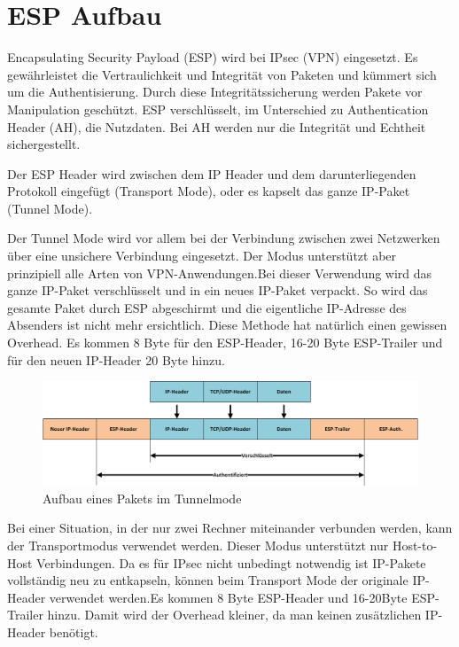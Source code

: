 \section{ESP Aufbau}
\label{sec:ESP Aufbau}

\noindent Encapsulating Security Payload (ESP) wird bei \ac{IPsec} (VPN) eingesetzt. Es gewährleistet die Vertraulichkeit und Integrität von Paketen und kümmert sich um die Authentisierung. Durch diese Integritätssicherung werden Pakete vor Manipulation geschützt. ESP verschlüsselt, im Unterschied zu Authentication Header (AH), die Nutzdaten. Bei AH werden nur die Integrität und Echtheit sichergestellt.\cite{elektronik_kompendium}

\noindent Der ESP Header wird zwischen dem IP Header und dem darunterliegenden Protokoll eingefügt (Transport Mode), oder es kapselt das ganze IP-Paket (Tunnel Mode).\cite{rfc4303}

\noindent Der Tunnel Mode wird vor allem bei der Verbindung zwischen zwei Netzwerken über eine unsichere Verbindung eingesetzt. Der Modus unterstützt aber prinzipiell alle Arten von VPN-Anwendungen.Bei dieser Verwendung wird das ganze IP-Paket verschlüsselt und in ein neues IP-Paket verpackt. So wird das gesamte Paket durch ESP abgeschirmt und die eigentliche IP-Adresse des Absenders ist nicht mehr ersichtlich. Diese Methode hat natürlich einen gewissen Overhead. Es kommen 8 Byte für den ESP-Header, 16-20 Byte ESP-Trailer und für den neuen IP-Header 20 Byte hinzu.\cite{elektronik_kompendium}

\begin{figure}[H]
    \begin{center}
        \includegraphics[trim=1 0 0 0,clip,width=\textwidth]{mainpart/analyse/img/ESP_Tunnelmode.png}
    \end{center}
    \caption{Aufbau eines Pakets im Tunnelmode}
\end{figure}

\noindent Bei einer Situation, in der nur zwei Rechner miteinander verbunden werden, kann der Transportmodus verwendet werden. Dieser Modus unterstützt nur Host-to-Host Verbindungen. Da es für \ac{IPsec} nicht unbedingt notwendig ist IP-Pakete vollständig neu zu entkapseln, können beim Transport Mode der originale IP-Header verwendet werden.Es kommen 8 Byte ESP-Header und 16-20Byte ESP-Trailer hinzu. Damit wird der Overhead kleiner, da man keinen zusätzlichen IP-Header benötigt.\cite{elektronik_kompendium}

